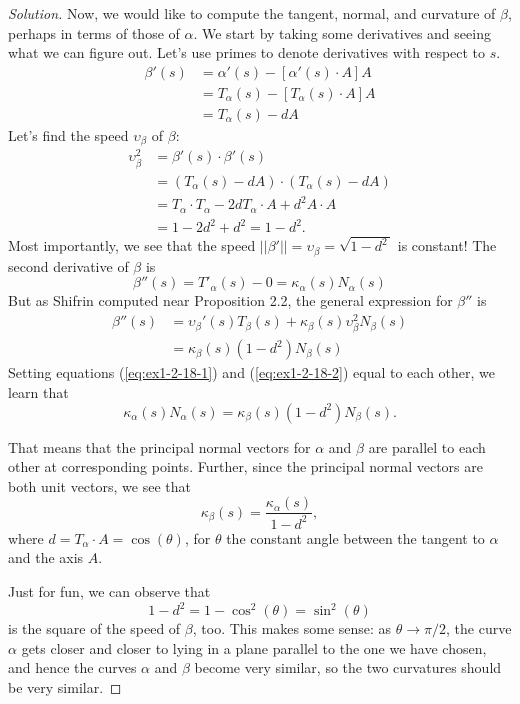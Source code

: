 \documentclass[Shifrin_Solutions_Spring_2018]{subfiles}
\begin{document}
\begin{proof}[Solution]
Now, we would like to compute the tangent, normal, and curvature of $\beta$, perhaps 
in terms of those of $\alpha$. We start by taking some derivatives and seeing what
we can figure out. Let's use primes to denote derivatives with respect to $s$.
\[
\begin{split}
\beta'(s) & = \alpha'(s) - \left[\alpha'(s) \cdot A \right] A \\
 & = T_{\alpha}(s) - \left[ T_{\alpha}(s)\cdot A \right] A \\
 & = T_{\alpha}(s) - d A
\end{split}
\]
Let's find the speed $\upsilon_{\beta}$ of $\beta$:
\[
\begin{split}
\upsilon_{\beta}^2 & = \beta'(s) \cdot \beta'(s) \\
 & = ( T_{\alpha}(s) - d A) \cdot (T_{\alpha}(s) - d A) \\
 & = T_{\alpha} \cdot T_{\alpha} - 2d T_{\alpha}\cdot A + d^2 A\cdot A \\
 & = 1 - 2d^2 + d^2 = 1-d^2.
\end{split}
\]
Most importantly, we see that the speed $||\beta'|| = \upsilon_{\beta} = \sqrt{1-d^2\, }$ is 
constant! The second derivative of $\beta$ is
\begin{equation}
\label{eq:ex1-2-18-1}
\beta''(s) = T'_{\alpha}(s) - 0 = \kappa_{\alpha}(s) N_{\alpha}(s)
\end{equation}
But as Shifrin computed near Proposition 2.2, the general expression for $\beta''$ is
\begin{equation}\label{eq:ex1-2-18-2}
\begin{split}
\beta''(s) &= \upsilon_{\beta}'(s) T_{\beta}(s) 
 + \kappa_{\beta}(s) \upsilon_{\beta}^2 N_{\beta}(s) \\
 & = \kappa_{\beta}(s) (1-d^2) N_{\beta}(s)
 \end{split}
\end{equation}
Setting equations (\ref{eq:ex1-2-18-1}) and (\ref{eq:ex1-2-18-2}) equal to each 
other, we learn that
\[
\kappa_{\alpha}(s) N_{\alpha}(s) = \kappa_{\beta}(s) (1-d^2) N_{\beta}(s).
\]

That means that the principal normal vectors for $\alpha$ and $\beta$ are parallel to 
each other at corresponding points. Further, since the principal normal vectors are 
both unit vectors, we see that
\[
\kappa_{\beta}(s) = \dfrac{\kappa_{\alpha}(s)}{1-d^2},
\]
where $d = T_{\alpha} \cdot A = \cos(\theta)$, for $\theta$ the constant angle between
the tangent to $\alpha$ and the axis $A$. 

Just for fun, we can observe that
\[
1-d^2 = 1-\cos^2(\theta) = \sin^2(\theta)
\]
is the square of the speed of $\beta$, too. This makes some sense: 
as $\theta \rightarrow \pi/2$, the curve $\alpha$ gets closer and closer to lying in 
a plane parallel to the one we have chosen, and hence the curves $\alpha$ and $\beta$ 
become very similar, so the two curvatures should be very similar. 
\end{proof}
\end{document}

